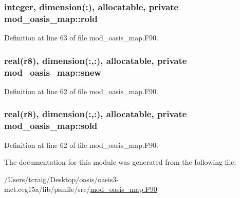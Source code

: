 \hypertarget{classmod__oasis__map_a2931a6f582d0173cc0e6b155b8cb55b7}{
\subsubsection[{rold}]{\setlength{\rightskip}{0pt plus 5cm}integer, dimension(\+:), allocatable, private mod\+\_\+oasis\+\_\+map\+::rold\hspace{0.3cm}{\ttfamily [private]}}}\label{classmod__oasis__map_a2931a6f582d0173cc0e6b155b8cb55b7}


Definition at line 63 of file mod\+\_\+oasis\+\_\+map.\+F90.

\hypertarget{classmod__oasis__map_a28b59479c467c58995c6300071ca140a}{
\subsubsection[{snew}]{\setlength{\rightskip}{0pt plus 5cm}real({\bf r8}), dimension(\+:,\+:), allocatable, private mod\+\_\+oasis\+\_\+map\+::snew\hspace{0.3cm}{\ttfamily [private]}}}\label{classmod__oasis__map_a28b59479c467c58995c6300071ca140a}


Definition at line 62 of file mod\+\_\+oasis\+\_\+map.\+F90.

\hypertarget{classmod__oasis__map_a1fc7e7f295910352524d442c5d0dbf79}{
\subsubsection[{sold}]{\setlength{\rightskip}{0pt plus 5cm}real({\bf r8}), dimension(\+:,\+:), allocatable, private mod\+\_\+oasis\+\_\+map\+::sold\hspace{0.3cm}{\ttfamily [private]}}}\label{classmod__oasis__map_a1fc7e7f295910352524d442c5d0dbf79}


Definition at line 62 of file mod\+\_\+oasis\+\_\+map.\+F90.



The documentation for this module was generated from the following file\+:\begin{DoxyCompactItemize}
\item 
/\+Users/tcraig/\+Desktop/oasis/oasis3-\/mct.\+ceg15a/lib/psmile/src/\hyperlink{mod__oasis__map_8_f90}{mod\+\_\+oasis\+\_\+map.\+F90}\end{DoxyCompactItemize}
